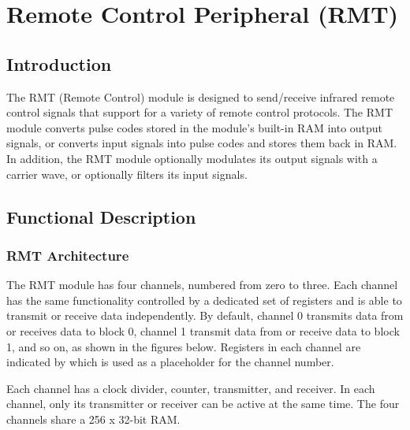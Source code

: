 \documentclass[main\_\_EN.tex]{subfiles}
\begin{document}

\ifglobal
\else
    {\let\clearpage\relax \listoftodos}
    {\let\clearpage\relax \listofdonetodos}
    \tableofcontents
\fi



\hypertarget{rmt}{}
\chapter{Remote Control Peripheral (RMT)}
\label{mod:rmt}


\section{Introduction}
The RMT (Remote Control) module is designed to send/receive infrared remote control signals that support for a variety of remote control protocols. The RMT module converts pulse codes stored in the module's built-in RAM into output signals, or converts input signals into pulse codes and stores them back in RAM. In addition, the RMT module optionally modulates its output signals with a carrier wave, or optionally filters its input signals.


\section{Functional Description}
\subsection{RMT Architecture}

The RMT module has four channels, numbered from zero to three. Each channel has the same functionality controlled by a dedicated set of registers and is able to transmit or receive data independently. By default, channel 0 transmits data from or receives data to block 0, channel 1 transmit data from or receive data to block 1, and so on, as shown in the figures below. Registers in each channel are indicated by  which is used as a placeholder for the channel number.

Each channel has a clock divider, counter, transmitter, and receiver. In each channel, only its transmitter or receiver can be active at the same time. The four channels share a 256 x 32-bit RAM.
\end{document}
